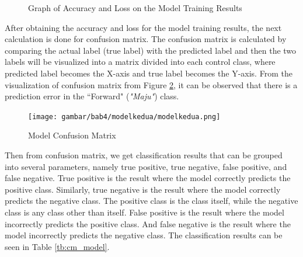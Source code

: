 \begin{figure}[H]
  \centering
    \hfil 

  \caption{Graph of Accuracy and Loss on the Model Training Results}
  \label{fig:acc_loss}
\end{figure}

After obtaining the accuracy and loss for the model training results, the next calculation is done for confusion matrix. The confusion matrix is calculated by comparing the actual label (true label) with the predicted label and then the two labels will be visualized into a matrix divided into each control class, where predicted label becomes the X-axis and true label becomes the Y-axis. From the visualization of confusion matrix from Figure \ref{fig:confuse}, it can be observed that there is a prediction error in the “Forward"  (\emph{"Maju"}) class.

\begin{figure} [H] \centering
  \texttt{[image: gambar/bab4/modelkedua/modelkedua.png]}
  \caption{Model Confusion Matrix}
  \label{fig:confuse}
\end{figure}

Then from confusion matrix, we get classification results that can be grouped into several parameters, namely true positive, true negative, false positive, and false negative. True positive is the result where the model correctly predicts the positive class. Similarly, true negative is the result where the model correctly predicts the negative class. The positive class is the class itself, while the negative class is any class other than itself. False positive is the result where the model incorrectly predicts the positive class. And false negative is the result where the model incorrectly predicts the negative class. The classification results can be seen in Table \ref{tb:cm_model}.

